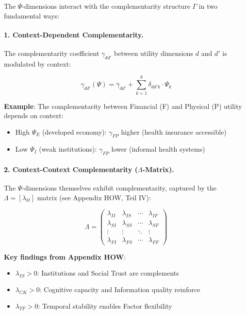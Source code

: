 The $\Psi$-dimensions interact with the complementarity structure $\Gamma$ in 
two fundamental ways:

\paragraph{1. Context-Dependent Complementarity.}

The complementarity coefficient $\gamma_{dd'}$ between utility dimensions $d$ 
and $d'$ is modulated by context:

\begin{equation}
\gamma_{dd'}(\Psi) = \bar{\gamma}_{dd'} + \sum_{k=1}^{8} \delta_{dd'k} \cdot \Psi_k
\label{eq:gamma-psi-modulation}
\end{equation}

\textbf{Example}: The complementarity between Financial (F) and Physical (P) 
utility depends on context:
\begin{itemize}
    \item High $\Psi_E$ (developed economy): $\gamma_{FP}$ higher (health insurance accessible)
    \item Low $\Psi_I$ (weak institutions): $\gamma_{FP}$ lower (informal health systems)
\end{itemize}

\paragraph{2. Context-Context Complementarity ($\Lambda$-Matrix).}

The $\Psi$-dimensions themselves exhibit complementarity, captured by the 
$\Lambda = [\lambda_{kl}]$ matrix (see Appendix HOW, Teil IV):

\begin{equation}
\Lambda = \begin{pmatrix}
\lambda_{II} & \lambda_{IS} & \cdots & \lambda_{IF} \\
\lambda_{SI} & \lambda_{SS} & \cdots & \lambda_{SF} \\
\vdots & \vdots & \ddots & \vdots \\
\lambda_{FI} & \lambda_{FS} & \cdots & \lambda_{FF}
\end{pmatrix}
\end{equation}

\textbf{Key findings from Appendix HOW}:
\begin{itemize}
    \item $\lambda_{IS} > 0$: Institutions and Social Trust are complements
    \item $\lambda_{CK} > 0$: Cognitive capacity and Information quality reinforce
    \item $\lambda_{TF} > 0$: Temporal stability enables Factor flexibility
\end{itemize}

